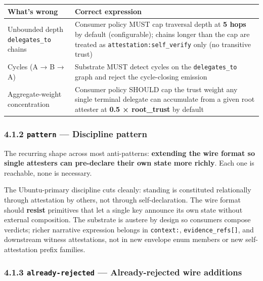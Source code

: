 \documentclass[11pt]{article}
\begin{document}
{\footnotesize
\begin{longtable}{|p{8.0cm}|p{8.0cm}|}\hline
\textbf{What's wrong} & \textbf{Correct expression} \\ \hline\endhead
Unbounded depth \texttt{delegates\_to} chains & Consumer policy MUST cap traversal depth at \textbf{5 hops} by default (configurable); chains longer than the cap are treated as \texttt{attestation:self\_verify} only (no transitive trust) \\ \hline
Cycles (A → B → A) & Substrate MUST detect cycles on the \texttt{delegates\_to} graph and reject the cycle-closing emission \\ \hline
Aggregate-weight concentration & Consumer policy SHOULD cap the trust weight any single terminal delegate can accumulate from a given root attester at \textbf{0.5 × root\_trust} by default \\ \hline
\end{longtable}}


\subsubsection*{4.1.2 \texttt{pattern} — Discipline pattern}


The recurring shape across most anti-patterns: \textbf{extending the wire format so single attesters can pre-declare their own state more richly}. Each one is reachable, none is necessary.


The Ubuntu-primary discipline cuts cleanly: standing is constituted relationally through attestation by others, not through self-declaration. The wire format should \textbf{resist} primitives that let a single key announce its own state without external composition. The substrate is austere by design so consumers compose verdicts; richer narrative expression belongs in \texttt{context:}, \texttt{evidence\_refs[]}, and downstream witness attestations, not in new envelope enum members or new self-attestation prefix families.


\subsubsection*{4.1.3 \texttt{already-rejected} — Already-rejected wire additions}
\end{document}
